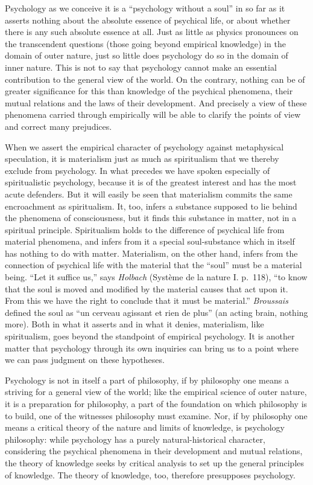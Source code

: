 \documentclass[12pt,a4paper]{book}
\newcommand{\opage}[1]{\marginnote{\footnotesize\textit{[#1]}}}
\begin{document}
Psychology as we conceive it is a ``psychology without a soul'' in so
far as it asserts nothing about the absolute essence of psychical life,
or about whether there is any such absolute essence at all. Just as
little as physics pronounces on the transcendent questions (those going
beyond empirical knowledge) in the domain of outer nature, just so little
does psychology do so in the domain of inner nature. This is not to say
that psychology cannot make an essential contribution to the
\opage{17}general view of the world. On the contrary, nothing can be of
greater significance for this than knowledge of the psychical phenomena,
their mutual relations and the laws of their development. And precisely
a view of these phenomena carried through empirically will be able to
clarify the points of view and correct many prejudices.

When we assert the empirical character of psychology against
metaphysical speculation, it is materialism just as much as spiritualism
that we thereby exclude from psychology. In what precedes we have spoken
especially of spiritualistic psychology, because it is of the greatest
interest and has the most acute defenders. But it will easily be seen
that materialism commits the same encroachment as spiritualism. It, too,
infers a substance supposed to lie behind the phenomena of
consciousness, but it finds this substance in matter, not in a spiritual
principle. Spiritualism holds to the difference of psychical life from
material phenomena, and infers from it a special soul-substance which in
itself has nothing to do with matter. Materialism, on the other hand,
infers from the connection of psychical life with the material that the
``soul'' must be a material being. ``Let it suffice us,'' says
\emph{Holbach} (Système de la nature I. p.~118), ``to know that the soul
is moved and modified by the material causes that act upon it. From this
we have the right to conclude that it must be material.''
\emph{Broussais} defined the soul as ``un cerveau agissant et rien de
plus'' (an acting brain, nothing more). Both in what it asserts and in
what it denies, materialism, like spiritualism, goes beyond the
standpoint of empirical psychology. It is another matter that psychology
through its own inquiries can bring us to a point where we can pass
judgment on these hypotheses.

Psychology is not in itself a part of philosophy, if by philosophy one
means a striving for a general view of the world; like the empirical
science of outer nature, it is a preparation for philosophy, a part of
the foundation on which philosophy is to build, one of the witnesses
philosophy must examine. Nor, if by philosophy one means a critical
theory of the nature and limits of knowledge, is psychology philosophy:
while psychology has a purely natural-historical character, considering
the psychical phenomena in their development
\opage{18}and mutual relations, the theory of knowledge seeks by critical
analysis to set up the general principles of knowledge. The theory of
knowledge, too, therefore presupposes psychology.
\end{document}
